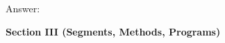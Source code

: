 \documentclass[12pt]{article}
\begin{document}
\begin{enumerate}
Answer: 


\end{enumerate}

\newpage

\noindent
{\bf Section III (Segments, Methods, Programs)}
\end{document}
